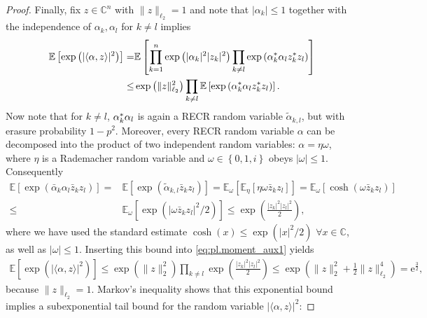 \begin{proof}
  Finally, fix $ z \in \mathbb{C}^n$ with $\|  z \|_{\ell_2}=1$ and note that $|\alpha_k| \leq 1$ together with the independence of $\alpha_k,\alpha_l$ for $k \neq l$ implies
  \begin{align}
    \mathbb{E} \left[ \exp \left( | \langle \alpha,  z \rangle|^2 \right) \right]
    =& \mathbb{E} \left[ \prod_{k=1}^n \exp \left( | \alpha_k|^2 |z_k|^2 \right) \prod_{k \neq l} \exp \left( {\alpha}^\ast_k \alpha_l {z}^\ast_k z_l \right) \right] \nonumber \\
    \leq& \exp \left( \|  z \|_{\ell_2}^2 \right) \prod_{k \neq l} \mathbb{E} \left[  \exp \left( {\alpha}^\ast_k \alpha_l {z}^\ast_k z_l \right)  \right]. \label{eq:pl.moment_aux1}
  \end{align}
  Now note that for $k \neq l$, ${\alpha}^\ast_k \alpha_l$ is again a RECR random variable $\tilde{\alpha}_{k,l}$, but with erasure probability $1-p^2$.
  Moreover, every RECR random variable $\alpha$ can be decomposed into the product of two independent random variables: $ \alpha= \eta \omega$, where $\eta$ is a Rademacher random variable and $\omega \in \left\{0, 1,i \right\}$ obeys $| \omega | \leq 1$.
  Consequently
  \begin{align}
    \mathbb{E} \left[ \exp \left( \bar{\alpha}_k \alpha_l \bar{z}_k z_l \right) \right]
    =& \mathbb{E} \left[ \exp \left( \tilde{\alpha}_{k,l} \bar{z}_k z_l \right) \right]
    = \mathbb{E}_{\omega} \left[ \mathbb{E}_\eta \left[ \eta \omega \bar{z}_k  z_l \right] \right]
    = \mathbb{E}_{\omega} \left[ \cosh \left( \omega \bar{z}_k z_l \right) \right] \\
    \leq & \mathbb{E}_\omega \left[ \exp \left( |\omega \bar{z}_k z_l|^2/2 \right) \right]
    \leq  \exp \left( \frac{|z_k|^2 |z_l|^2}{2} \right),
  \end{align}
  where we have used the standard estimate $\cosh (x) \leq \exp \left( |x|^2/2 \right)$ $\forall x \in \mathbb{C}$, as well as $| \omega| \leq 1$. Inserting this bound into \eqref{eq:pl.moment_aux1} yields
  \begin{align}
    \mathbb{E} \left[ \exp \left( | \langle  \alpha,  z \rangle|^2 \right) \right]
    \leq \exp \left( \|  z \|_2^2 \right) \prod_{k \neq l} \exp \left( \frac{|z_k|^2 |z_l|^2}{2} \right)
    \leq \exp \left( \|  z \|_2^2 + \frac{1}{2}\|  z \|_{\ell_2}^4 \right) = \mathrm{e}^{\frac{3}{2}},
  \end{align}
  because $\|  z \|_{\ell_2}=1$.
  Markov's inequality shows that this exponential bound implies a subexponential tail bound for the random variable $| \langle  \alpha, z \rangle|^2$:

\end{proof}
